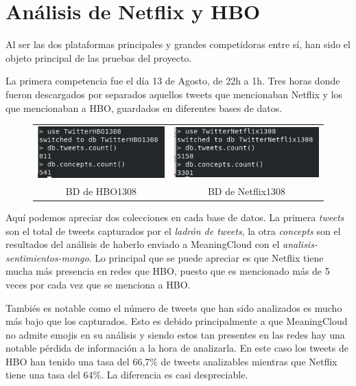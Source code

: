 \section{Análisis de Netflix y HBO}
Al ser las dos plataformas principales y grandes competidoras entre sí, han sido el objeto principal de las pruebas del proyecto.

La primera competencia fue el día 13 de Agosto, de 22h a 1h. Tres horas donde fueron descargados por separados aquellos tweets que mencionaban Netflix y los que mencionaban a HBO, guardados en diferentes bases de datos. 

\begin{figure}[H]
	\centering
	\begin{tabular}{c c}
		
		\includegraphics[scale=.62]{imagenes/HBO1308Mongo.png}
		&  \includegraphics[scale=.65]{imagenes/Netflix1308Mongo.png} \\ 
		
		{BD de HBO1308}
		
		&  {BD de Netflix1308} \\ 
		
	\end{tabular} 
	\label{fig:Mongo1308}
\end{figure}

Aquí podemos apreciar dos colecciones en cada base de datos. La primera \textit{tweets} son el total de tweets capturados por el \textit{ladrón de tweets}, la otra \textit{concepts} son el resultados del análisis de haberlo enviado a MeaningCloud con el \textit{analisis-sentimientos-mongo}. Lo principal que se puede apreciar es que Netflix tiene mucha más presencia en redes que HBO, puesto que es mencionado más de 5 veces por cada vez que se menciona a HBO. 

Tambiés es notable como el número de tweets que han sido analizados es mucho más bajo que los capturados. Esto es debido principalmente a que MeaningCloud no admite emojis en su análisis y siendo estos tan presentes en las redes hay una notable pérdida de información a la hora de analizarla. En este caso los tweets de HBO han tenido una tasa del 66,7\% de tweets analizables mientras que Netflix tiene una tasa del 64\%. La diferencia es casi despreciable. 


